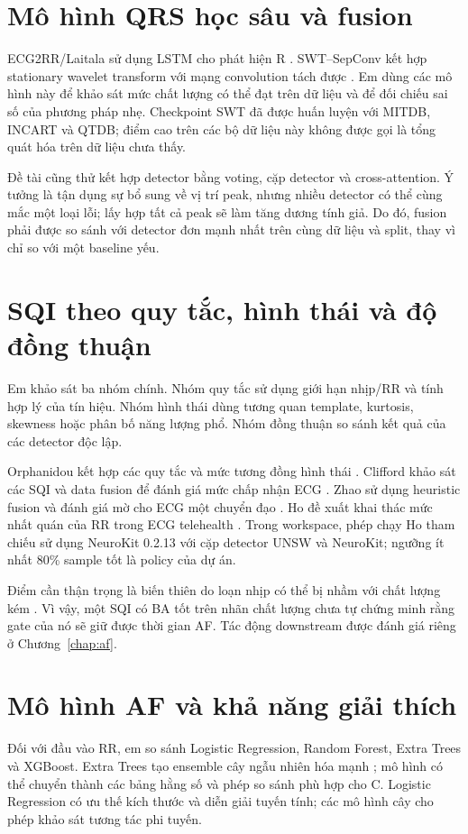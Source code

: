 \documentclass[12pt,a4paper,oneside]{report}
\begin{document}
\section{Mô hình QRS học sâu và fusion}
ECG2RR/Laitala sử dụng LSTM cho phát hiện R \cite{laitala2020}. SWT--SepConv kết hợp stationary wavelet transform với mạng convolution tách được \cite{yun2022}. Em dùng các mô hình này để khảo sát mức chất lượng có thể đạt trên dữ liệu và để đối chiếu sai số của phương pháp nhẹ. Checkpoint SWT đã được huấn luyện với MITDB, INCART và QTDB; điểm cao trên các bộ dữ liệu này không được gọi là tổng quát hóa trên dữ liệu chưa thấy.

Đề tài cũng thử kết hợp detector bằng voting, cặp detector và cross-attention. Ý tưởng là tận dụng sự bổ sung về vị trí peak, nhưng nhiều detector có thể cùng mắc một loại lỗi; lấy hợp tất cả peak sẽ làm tăng dương tính giả. Do đó, fusion phải được so sánh với detector đơn mạnh nhất trên cùng dữ liệu và split, thay vì chỉ so với một baseline yếu.

\section{SQI theo quy tắc, hình thái và độ đồng thuận}
Em khảo sát ba nhóm chính. Nhóm quy tắc sử dụng giới hạn nhịp/RR và tính hợp lý của tín hiệu. Nhóm hình thái dùng tương quan template, kurtosis, skewness hoặc phân bố năng lượng phổ. Nhóm đồng thuận so sánh kết quả của các detector độc lập.

Orphanidou kết hợp các quy tắc và mức tương đồng hình thái \cite{orphanidou2015}. Clifford khảo sát các SQI và data fusion để đánh giá mức chấp nhận ECG \cite{clifford2012}. Zhao sử dụng heuristic fusion và đánh giá mờ cho ECG một chuyển đạo \cite{zhao2018}. Ho đề xuất khai thác mức nhất quán của RR trong ECG telehealth \cite{ho2025}. Trong workspace, phép chạy Ho tham chiếu sử dụng NeuroKit 0.2.13 với cặp detector UNSW và NeuroKit; ngưỡng ít nhất 80\% sample tốt là policy của dự án.

Điểm cần thận trọng là biến thiên do loạn nhịp có thể bị nhầm với chất lượng kém \cite{daluwatte2016}. Vì vậy, một SQI có BA tốt trên nhãn chất lượng chưa tự chứng minh rằng gate của nó sẽ giữ được thời gian AF. Tác động downstream được đánh giá riêng ở Chương~\ref{chap:af}.

\section{Mô hình AF và khả năng giải thích}
Đối với đầu vào RR, em so sánh Logistic Regression, Random Forest, Extra Trees và XGBoost. Extra Trees tạo ensemble cây ngẫu nhiên hóa mạnh \cite{geurts2006}; mô hình có thể chuyển thành các bảng hằng số và phép so sánh phù hợp cho C. Logistic Regression có ưu thế kích thước và diễn giải tuyến tính; các mô hình cây cho phép khảo sát tương tác phi tuyến.
\end{document}
